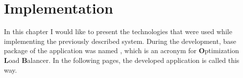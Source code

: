 \chapter{Implementation}\label{ch:used-technologies}
In this chapter I would like to present the technologies that were used while implementing the previously described system.
During the development,
base package of the application was named ,
which is an acronym for \textbf{O}ptimization \textbf{L}oad \textbf{B}alancer.
In the following pages, 
the developed application is called this way.









